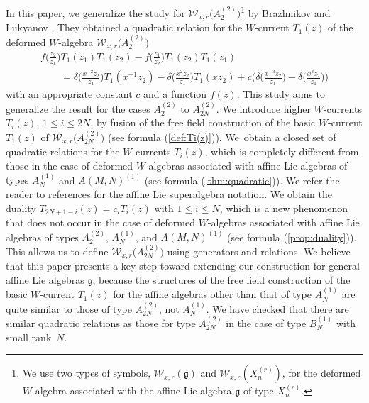 \documentclass[pdftex]{sigma}
\numberwithin{equation}{section}
\begin{document}
In this {paper}, we generalize the study for
${\mathcal W}_{x,r}\bigl(A_2^{(2)}\bigr)$\footnote{We use two types of symbols,
${\mathcal W}_{x,r}({\mathfrak g})$ and
${\mathcal W}_{x,r}(X_n^{(r)})$,
for the deformed $W$-algebra associated with the affine Lie algebra
${\mathfrak g}$ of type $X_n^{(r)}$.}
by Brazhnikov and Lukyanov \cite{Brazhnikov-Lukyanov}.
They obtained
a quadratic relation for
the $W$-current $T_1(z)$ of
the deformed $W$-algebra ${\mathcal W}_{x,r}\bigl(A_2^{(2)}\bigr)$
\begin{gather*}
f\biggl(\frac{z_2}{z_1}\biggr)T_1(z_1)T_1(z_2)-
f\biggl(\frac{z_1}{z_2}\biggr)T_1(z_2)T_1(z_1)
\\ \qquad
{}=\delta\biggl(\frac{x^{-2}z_2}{z_1}\biggr)T_1(x^{-1}z_2)
-\delta\biggl(\frac{x^{2}z_2}{z_1}\biggr)T_1(xz_2)+c \biggl(
\delta\biggl(\frac{x^{-3}z_2}{z_1}\biggr)
-\delta\biggl(\frac{x^{3}z_2}{z_1}\biggr)\biggr)
\end{gather*}
with an appropriate constant $c$ and a function $f(z)$.
This study aims to generalize the result for the cases
$A_2^{(2)}$ to $A_{2N}^{(2)}$.
We introduce higher
$W$-currents $T_i(z)${, $1 \leq i \leq 2N$,}
by fusion of
the free field construction of the basic $W$-current $T_1(z)$
of ${\mathcal W}_{x,r}\bigl(A_{2N}^{(2)}\bigr)$ \cite{Frenkel-Reshetikhin1}
(see formula (\ref{def:Ti(z)})).
We~obtain a closed set of quadratic relations for the $W$-currents $T_i(z)$,
which is completely different from those
{in the case of deformed $W$-algebras associated with affine Lie algebras of types} $A_N^{(1)}$ and $A(M,N)^{(1)}$
(see formula (\ref{thm:quadratic})).
{We refer the reader to references \cite{Leur1, Leur2}
for the affine Lie superalgebra notation.}
We obtain the duality $T_{2N+1-i}(z)=c_i T_{i}(z)$
with $1 \leq i \leq N$, which
is a new {phenomenon} that does not occur in
the case of deformed $W$-algebras associated with
affine Lie algebras of types
$A_2^{(2)}$, $A_N^{(1)}$, and $A(M,N)^{(1)}$
(see formula (\ref{prop:duality})).
This allows us to define ${\mathcal W}_{x,r}\bigl(A_{2N}^{(2)}\bigr)$ using
generators and relations.
We believe
that this paper presents a key step toward extending our construction for general affine Lie algebras
${\mathfrak g}$, because the structures of
the free field construction of the basic $W$-current
$T_1(z)$ for the affine algebras other than {that of type}
$A_N^{(1)}$
are quite similar to those of {type} $A_{2N}^{(2)}$, not $A_N^{(1)}$.
We have checked that there are similar quadratic relations as
those {for type $A_{2N}^{(2)}$} in the case
of {type} $B_N^{(1)}$ with small rank~$N$.
\end{document}
